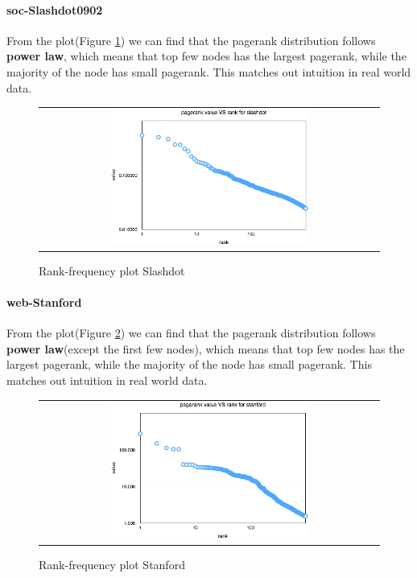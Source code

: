 \paragraph{soc-Slashdot0902}
From the plot(Figure \ref{t2:slashdot}) we can find that the pagerank distribution follows {\bf power law}, which means that top few nodes has the largest pagerank, while the majority of the node has small pagerank. This matches out intuition in real world data. 
\begin{figure}[!htbf]
\begin{center}
\begin{tabular}{c}
    \includegraphics[width=0.6\textwidth]{FIG/t2_slashdot.png}
\end{tabular}
\caption{Rank-frequency plot Slashdot}
\label{t2:slashdot}
\end{center}
\end{figure}

\paragraph{web-Stanford}
From the plot(Figure \ref{t2:stanford}) we can find that the pagerank distribution follows {\bf power law}(except the first few nodes), which means that top few nodes has the largest pagerank, while the majority of the node has small pagerank. This matches out intuition in real world data. 
\begin{figure}[!htbf]
\begin{center}
\begin{tabular}{c}
    \includegraphics[width=0.6\textwidth]{FIG/t2_stanford.png}
\end{tabular}
\caption{Rank-frequency plot Stanford}
\label{t2:stanford}
\end{center}
\end{figure}

